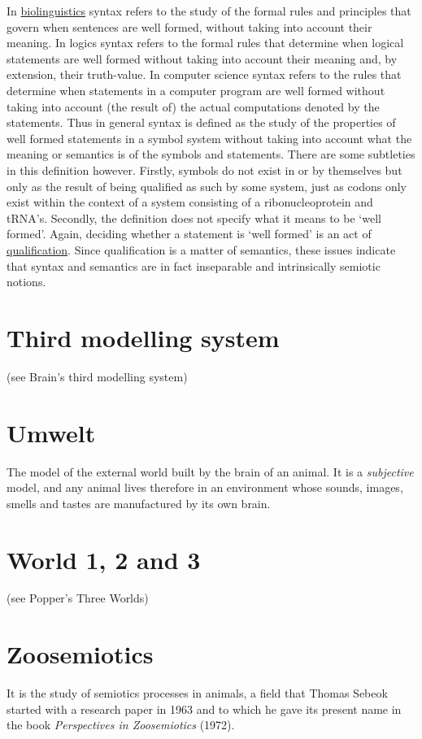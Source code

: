 \documentclass[12pt]{article}
\begin{document}
In \hyperlink{biolinguistics}{biolinguistics} syntax refers to the
study of the formal rules and principles that govern when sentences
are well formed, without taking into account their meaning. In logics
syntax refers to the formal rules that determine when logical
statements are well formed without taking into account their meaning
and, by extension, their truth-value.  In computer science syntax
refers to the rules that determine when statements in a computer
program are well formed without taking into account (the result of)
the actual computations denoted by the statements. Thus in general
syntax is defined as the study of the properties of well formed
statements in a symbol system without taking into account what the
meaning or semantics is of the symbols and statements.  There are some
subtleties in this definition however. Firstly, symbols do not exist
in or by themselves but only as the result of being qualified as such
by some system, just as codons only exist within the context of a
system consisting of a ribonucleoprotein and tRNA's. Secondly, the
definition does not specify what it means to be `well formed'. Again,
deciding whether a statement is `well formed' is an act of
\hyperlink{qualification}{qualification}. Since qualification is a
matter of semantics, these issues indicate that syntax and semantics
are in fact inseparable and intrinsically semiotic notions.

\section{Third modelling system} (see Brain's third modelling system)


\section{Umwelt}
The model of the external world built by the brain of an animal. It is a \textit{subjective} model, and any animal lives therefore in an environment whose sounds, images, smells and tastes are manufactured by its own brain.


\section{World 1, 2 and 3} (see Popper's Three Worlds)


\section{Zoosemiotics}
It is the study of semiotics processes in animals, a field that Thomas Sebeok started with a research paper in 1963 and to which he gave its present name in the book \textit{Perspectives in Zoosemiotics} (1972). 
 



\end{document}

